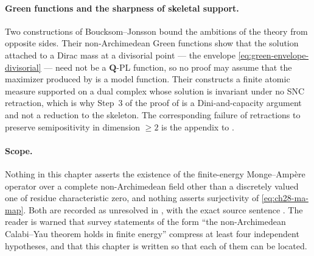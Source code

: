 \paragraph{Green functions and the sharpness of skeletal support.}
Two constructions of Boucksom--Jonsson bound the ambitions of the theory
from opposite sides.  Their non-Archimedean Green functions
\cite[Theorem~A]{BJGreen24} show that the solution attached to a Dirac mass
at a divisorial point --- the envelope
\eqref{eq:green-envelope-divisorial} --- need not be a \(\mathbf Q\)-PL
function, so no proof may assume that the maximizer produced by
 is a model function.  Their
\cite[Theorem~B]{BJGreen24} constructs a finite atomic measure supported on a
dual complex whose solution is invariant under no SNC retraction, which is
why Step~3 of the proof of  is a Dini-and-capacity
argument and not a reduction to the skeleton.  The corresponding failure of
retractions to preserve semipositivity in dimension \(\geq2\) is the appendix
to \cite{GJKM19}.

\paragraph{Scope.}
Nothing in this chapter asserts the existence of the finite-energy
Monge--Amp\`ere operator over a complete non-Archimedean field other than a
discretely valued one of residue characteristic zero, and nothing asserts
surjectivity of \eqref{eq:ch28-ma-map}.  Both are recorded as unresolved in
, with the exact source sentence
\cite[Remark~4.4]{PS23Hybrid}.  The reader is warned that survey statements
of the form ``the non-Archimedean Calabi--Yau theorem holds in finite
energy'' compress at least four independent hypotheses, and that this chapter
is written so that each of them can be located.
